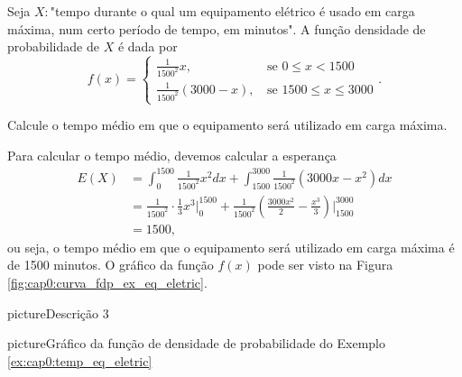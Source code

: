 \documentclass[11pt,fleqn]{book}
\numberwithin{mpicture}{chapter}
\numberwithin{mtable}{chapter}
\numberwithin{mframe}{chapter}
\begin{document}
\begin{example}
	\label{ex:cap0:temp_eq_eletric}
	Seja $X:$"tempo durante o qual um equipamento elétrico é usado em carga máxima, num certo período de tempo, em minutos". A função densidade de probabilidade de $X$ é dada por
	\[
		f(x)=\begin{cases}
			\frac{1}{1500^2}x\text{,}&\text{ se } 0 \leqslant x < 1500\\
			\frac{1}{1500^2}(3000-x)\text{,}&\text{ se } 1500\leqslant x \leqslant 3000
		\end{cases}
		\text{.}
	\]
	
	Calcule o tempo médio em que o equipamento será utilizado em carga máxima.
	
	Para calcular o tempo médio, devemos calcular a esperança
	\begin{align*}
		E(X)&=\int_{0}^{1500} \frac{1}{1500^2}x^2dx
			 +\int_{1500}^{3000}\frac{1}{1500^2}(3000x-x^2)dx\\
			&=\frac{1}{1500^2}\cdot \frac{1}{3}x^3\Big|_{0}^{1500}
			 +\frac{1}{1500^2}\left (\frac{3000x^2}{2} - \frac{x^3}{3} \right ) \Big|_{1500}^{3000}\\
			&=1500\text{,}
	\end{align*}
	ou seja, o tempo médio em que o equipamento será utilizado em carga máxima é de 1500 minutos. O gráfico da função $f(x)$ pode ser visto na Figura \ref{fig:cap0:curva_fdp_ex_eq_eletric}.
\end{example}

\begin{sidepicture}{10cm}{picture}{Descrição 3}
	\label{testlabel6}
\end{sidepicture}

\begin{sidepicture}{5cm}{picture}{Gráfico da função de densidade de probabilidade do Exemplo \ref{ex:cap0:temp_eq_eletric}}
	\label{fig:cap0:curva_fdp_ex_eq_eletric}
\end{sidepicture}
\end{document}
